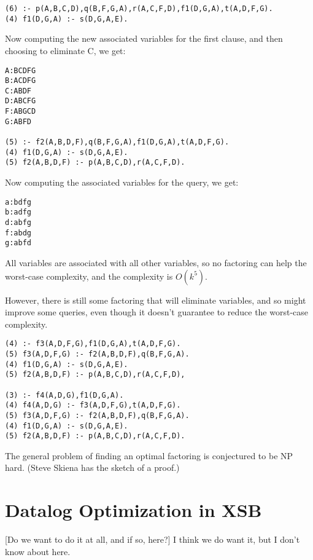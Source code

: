 \begin{verbatim}
(6) :- p(A,B,C,D),q(B,F,G,A),r(A,C,F,D),f1(D,G,A),t(A,D,F,G).
(4) f1(D,G,A) :- s(D,G,A,E).
\end{verbatim}

Now computing the new associated variables for the first clause, and
then choosing to eliminate C, we get:

\begin{verbatim}
A:BCDFG
B:ACDFG
C:ABDF
D:ABCFG
F:ABGCD
G:ABFD

(5) :- f2(A,B,D,F),q(B,F,G,A),f1(D,G,A),t(A,D,F,G).
(4) f1(D,G,A) :- s(D,G,A,E).
(5) f2(A,B,D,F) :- p(A,B,C,D),r(A,C,F,D).
\end{verbatim}

Now computing the associated variables for the query, we get:

\begin{verbatim}
a:bdfg
b:adfg
d:abfg
f:abdg
g:abfd
\end{verbatim}

All variables are associated with all other variables, so no factoring
can help the worst-case complexity, and the complexity is $O(k^5)$.

However, there is still some factoring that will eliminate variables,
and so might improve some queries, even though it doesn't guarantee to
reduce the worst-case complexity.

\begin{verbatim}
(4) :- f3(A,D,F,G),f1(D,G,A),t(A,D,F,G).
(5) f3(A,D,F,G) :- f2(A,B,D,F),q(B,F,G,A).
(4) f1(D,G,A) :- s(D,G,A,E).
(5) f2(A,B,D,F) :- p(A,B,C,D),r(A,C,F,D),

(3) :- f4(A,D,G),f1(D,G,A).
(4) f4(A,D,G) :- f3(A,D,F,G),t(A,D,F,G).
(5) f3(A,D,F,G) :- f2(A,B,D,F),q(B,F,G,A).
(4) f1(D,G,A) :- s(D,G,A,E).
(5) f2(A,B,D,F) :- p(A,B,C,D),r(A,C,F,D).
\end{verbatim}

The general problem of finding an optimal factoring is conjectured to
be NP hard.  (Steve Skiena has the sketch of a proof.)


\section{Datalog Optimization in XSB}

[Do we want to do it at all, and if so, here?]
I think we do want it, but I don't know about here.

